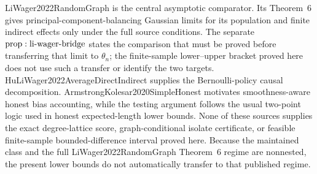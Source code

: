 LiWager2022RandomGraph is the central asymptotic comparator.  Its Theorem~6 gives principal-component-balancing Gaussian limits for its population and finite indirect effects only under the full source conditions.  The separate \({\rm prop:li\text{-}wager\text{-}bridge}\) states the comparison that must be proved before transferring that limit to \(\theta_n\); the finite-sample lower--upper bracket proved here does not use such a transfer or identify the two targets.  HuLiWager2022AverageDirectIndirect supplies the Bernoulli-policy causal decomposition.  ArmstrongKolesar2020SimpleHonest motivates smoothness-aware honest bias accounting, while the testing argument follows the usual two-point logic used in honest expected-length lower bounds.  None of these sources supplies the exact degree-lattice score, graph-conditional isolate certificate, or feasible finite-sample bounded-difference interval proved here.  Because the maintained class and the full LiWager2022RandomGraph Theorem~6 regime are nonnested, the present lower bounds do not automatically transfer to that published regime.